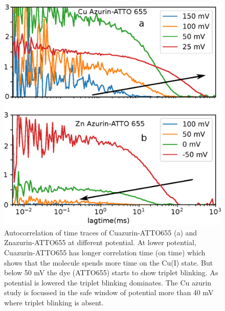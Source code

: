 \documentclass[11pt,a4paper,onecolumn]{article}
\begin{document}
\begin{figure}
  \centering
  \includegraphics[width=\textwidth,keepaspectratio]{fcs_comparision.eps}
  \makeatletter
  \renewcommand{\fnum@figure}{\figurename~S\thefigure}
  \makeatother
  \caption{Autocorrelation of time traces of Cuazurin-ATTO655 (a) and Znazurin-ATTO655 at different potential. At lower potential, Cuazurin-ATTO655 has longer correlation time (on time) which shows that the molecule spends more time on the Cu(I) state. But below 50 mV the dye (ATTO655) starts to show triplet blinking. As potential is lowered the triplet blinking dominates. The Cu azurin study is focussed in the safe window of potential more than 40 mV where triplet blinking is absent.}
  \label{SIfig:fcscomparision}
\end{figure}
\end{document}
